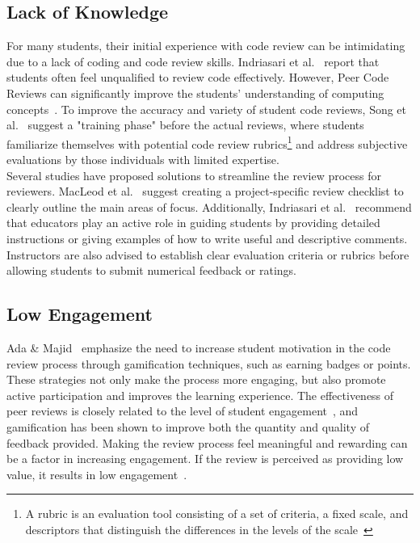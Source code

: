 \subsection{Lack of Knowledge}
For many students, their initial experience with code review can be intimidating due to a lack of coding and code review skills. Indriasari et al.~\cite{Indriasari_Luxton_2020} report that students often feel unqualified to review code effectively. However, Peer Code Reviews can significantly improve the students' understanding of computing concepts~\cite{Brown_2019}. To improve the accuracy and variety of student code reviews, Song et al.~\cite{Song_Goldstein_Sakr_2020} suggest a "training phase" before the actual reviews, where students familiarize themselves with potential code review rubrics\footnote{A rubric is an evaluation tool consisting of a set of criteria, a fixed scale, and descriptors that distinguish the differences in the levels of the scale~\cite{McTighe_Frontier}} and address subjective evaluations by those individuals with limited expertise. \\

Several studies have proposed solutions to streamline the review process for reviewers. MacLeod et al.~\cite{MacLeod_2018} suggest creating a project-specific review checklist to clearly outline the main areas of focus. Additionally, Indriasari et al.~\cite{Indriasari_Luxton_2020} recommend that educators play an active role in guiding students by providing detailed instructions or giving examples of how to write useful and descriptive comments. Instructors are also advised to establish clear evaluation criteria or rubrics before allowing students to submit numerical feedback or ratings. \\

\subsection{Low Engagement}
Ada \& Majid~\cite{Ada_Majid_2022} emphasize the need to increase student motivation in the code review process through gamification techniques, such as earning badges or points. These strategies not only make the process more engaging, but also promote active participation and improves the learning experience. The effectiveness of peer reviews is closely related to the level of student engagement~\cite{Indriasari_Luxton_2020}, and gamification has been shown to improve both the quantity and quality of feedback provided. Making the review process feel meaningful and rewarding can be a factor in increasing engagement. If the review is perceived as providing low value, it results in low engagement~\cite{Berkling_Neubehler_2019}. \\


